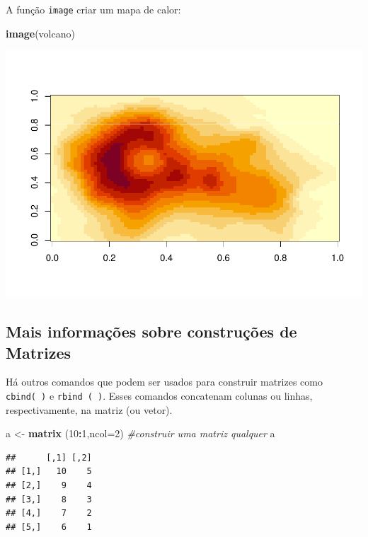 \documentclass[]{book}
\newenvironment{Shaded}{\begin{snugshade}}{\end{snugshade}}
\newcommand{\CommentTok}[1]{\textcolor[rgb]{0.56,0.35,0.01}{\textit{#1}}}
\newcommand{\DataTypeTok}[1]{\textcolor[rgb]{0.13,0.29,0.53}{#1}}
\newcommand{\DecValTok}[1]{\textcolor[rgb]{0.00,0.00,0.81}{#1}}
\newcommand{\KeywordTok}[1]{\textcolor[rgb]{0.13,0.29,0.53}{\textbf{#1}}}
\newcommand{\NormalTok}[1]{#1}
\newcommand{\OperatorTok}[1]{\textcolor[rgb]{0.81,0.36,0.00}{\textbf{#1}}}
\newcommand{\StringTok}[1]{\textcolor[rgb]{0.31,0.60,0.02}{#1}}
\begin{document}
A função \texttt{image} criar um mapa de calor:

\begin{Shaded}
\begin{Highlighting}[]
\KeywordTok{image}\NormalTok{(volcano)}
\end{Highlighting}
\end{Shaded}

\includegraphics{TudodoR_files/figure-latex/unnamed-chunk-76-1.pdf}

\hypertarget{mais-informacoes-sobre-construcoes-de-matrizes}{%
\subsection{Mais informações sobre construções de Matrizes}\label{mais-informacoes-sobre-construcoes-de-matrizes}}

Há outros comandos que podem ser usados para construir matrizes como \texttt{cbind(\ )} e \texttt{rbind\ (\ )}. Esses comandos concatenam colunas ou linhas, respectivamente, na matriz (ou vetor).

\begin{Shaded}
\begin{Highlighting}[]
\NormalTok{a <-}\StringTok{ }\KeywordTok{matrix}\NormalTok{ (}\DecValTok{10}\OperatorTok{:}\DecValTok{1}\NormalTok{,}\DataTypeTok{ncol=}\DecValTok{2}\NormalTok{) }\CommentTok{#construir uma matriz qualquer}
\NormalTok{a}
\end{Highlighting}
\end{Shaded}

\begin{verbatim}
##      [,1] [,2]
## [1,]   10    5
## [2,]    9    4
## [3,]    8    3
## [4,]    7    2
## [5,]    6    1
\end{verbatim}
\end{document}
